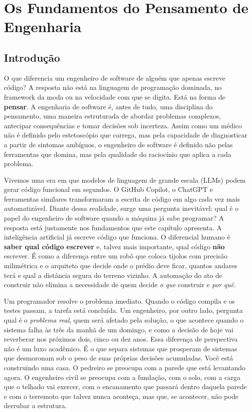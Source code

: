 \chapter{Os Fundamentos do Pensamento de Engenharia}

\section{Introdução}

O que diferencia um engenheiro de software de alguém que apenas escreve
código? A resposta não está na linguagem de programação dominada, no
framework da moda ou na velocidade com que se digita. Está na forma de
\textbf{pensar}. A engenharia de software é, antes de tudo, uma disciplina
do pensamento, uma maneira estruturada de abordar problemas complexos,
antecipar consequências e tomar decisões sob incerteza. Assim como um
médico não é definido pelo estetoscópio que carrega, mas pela capacidade
de diagnosticar a partir de sintomas ambíguos, o engenheiro de software
é definido não pelas ferramentas que domina, mas pela qualidade do
raciocínio que aplica a cada problema.

Vivemos uma era em que modelos de linguagem de grande escala (LLMs) podem
gerar código funcional em segundos. O GitHub Copilot, o ChatGPT e ferramentas
similares transformaram a escrita de código em algo cada vez mais automatizável.
Diante dessa realidade, surge uma pergunta inevitável: qual é o papel do
engenheiro de software quando a máquina já sabe programar? A resposta está
justamente nos fundamentos que este capítulo apresenta. A inteligência
artificial já escreve código que funciona. O diferencial humano é
\textbf{saber qual código escrever} e, talvez mais importante, qual
código \textbf{não} escrever. É como a diferença entre um robô que coloca
tijolos com precisão milimétrica e o arquiteto que decide onde o prédio
deve ficar, quantos andares terá e qual a distância segura do terreno
vizinho. A automação do ato de construir não elimina a necessidade de quem
decide \emph{o que} construir e \emph{por quê}.

Um programador resolve o problema imediato. Quando o código compila e os
testes passam, a tarefa está concluída. Um engenheiro, por outro lado,
pergunta qual é o \emph{problema real}, quem será afetado pela solução,
o que acontece quando o sistema falha às três da manhã de um domingo, e
como a decisão de hoje vai reverberar nos próximos dois, cinco ou dez anos.
Essa diferença de perspectiva não é um luxo acadêmico. É o que separa
sistemas que prosperam de sistemas que desmoronam sob o peso de suas
próprias decisões acumuladas. Você está construindo uma casa. O pedreiro
se preocupa com a parede que está levantando agora. O engenheiro civil se
preocupa com a fundação, com o solo, com a carga que o telhado vai exercer,
com o encanamento que passará dentro daquela parede e com o terremoto que
talvez nunca aconteça, mas que, se acontecer, não pode derrubar a estrutura.

